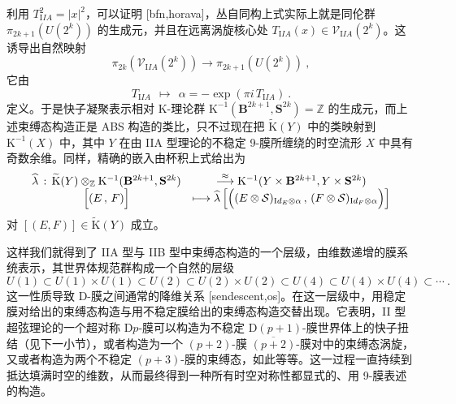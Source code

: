 \documentclass[11pt,a4paper]{ctexart}
\begin{document}
利用 \(T_{\mathrm IIA}^2=|x|^2\)，可以证明 [bfn,horava]，丛自同构上式实际上就是同伦群 \(\pi_{2k+1}(U(2^k))\) 的生成元，并且在远离涡旋核心处 \(T_{\mathrm IIA}(x)\in{\mathcal V}_{\mathrm IIA}(2^k)\)。这诱导出自然映射 \[\pi_{2k}\left({\mathcal V}_{\mathrm IIA}(2^k)\right)\longrightarrow
\pi_{2k+1}\left(U(2^k)\right)\ ,\] 它由 \[T_{\mathrm IIA}~~\longmapsto~~\alpha=-\exp(\pi i\,T_{\mathrm IIA})\ .\] 定义。于是快子凝聚表示相对 K-理论群 \({\mathrm K}^{-1}({\mathbf B}^{2k+1},{\mathbf S}^{2k})= {\mathbb{Z}}\) 的生成元，而上述束缚态构造正是 ABS 构造的类比，只不过现在把 \(\widetilde{{\mathrm K}}(Y)\) 中的类映射到 \({\mathrm K}^{-1}(X)\) 中，其中 \(Y\) 在由 IIA 型理论的不稳定 9-膜所缠绕的时空流形 \(X\) 中具有奇数余维。同样，精确的嵌入由杯积上式给出为 \[\begin{matrix}
\widehat{\lambda}\,:\,\widetilde{{\mathrm K}}(Y)\otimes_{\mathbb{Z}}
{\mathrm K}^{-1}({\mathbf B}^{2k+1},{\mathbf S}^{2k})&\stackrel{\approx}{\longrightarrow}
{\mathrm K}^{-1}(Y\times{\mathbf B}^{2k+1},Y\times {\mathbf S}^{2k})\\
\Bigl[(E\,,\,F)\Bigr]&\longmapsto\widehat{\lambda}
\left[\Bigl((E\otimes{\mathcal S})_{{\mathrm Id}_E\otimes\alpha}
\,,\,(F\otimes{\mathcal S})_{{\mathrm Id}_F\otimes\alpha}\Bigr)\right]
\end{matrix}\] 对 \([(E,F)]\in \widetilde{{\mathrm K}}(Y)\) 成立。

这样我们就得到了 IIA 型与 IIB 型中束缚态构造的一个层级，由维数递增的膜系统表示，其世界体规范群构成一个自然的层级 \[U(1)\subset U(1)\times U(1)\subset U(2)\subset U(2)\times U(2)\subset U(4)
\subset U(4)\times U(4)\subset \cdots \ .\] 这一性质导致 D-膜之间通常的降维关系 [sendescent,os]。在这一层级中，用稳定膜对给出的束缚态构造与用不稳定膜给出的束缚态构造交替出现。它表明，II 型超弦理论的一个超对称 D\(p\)-膜可以构造为不稳定 D\((p+1)\)-膜世界体上的快子扭结（见下一小节），或者构造为一个 \((p+2)\)-膜 \(\overline{(p+2)}\)-膜对中的束缚态涡旋，又或者构造为两个不稳定 \((p+3)\)-膜的束缚态，如此等等。这一过程一直持续到抵达填满时空的维数，从而最终得到一种所有时空对称性都显式的、用 9-膜表述的构造。
\end{document}
